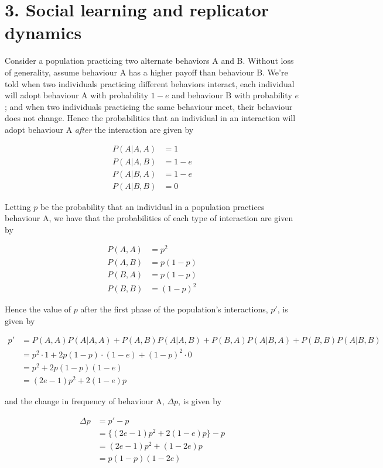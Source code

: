 \documentclass{article}
\begin{document}
\section*{3. Social learning and replicator dynamics}

Consider a population practicing two alternate behaviors A and B.
Without loss of generality, assume behaviour A has a higher payoff than
behaviour B. We're told when two individuals practicing different
behaviors interact, each individual will adopt behaviour A with
probability $1 - e$ and behaviour B with probability $e$; and when two
individuals practicing the same behaviour meet, their behaviour does not
change. Hence the probabilities that an individual in an interaction
will adopt behaviour A \textit{after} the interaction are given by

\begin{align*}
    P(A|A,A) &= 1 \\
    P(A|A,B) &= 1 - e \\
    P(A|B,A) &= 1 - e \\
    P(A|B,B) &= 0
\end{align*}

Letting $p$ be the probability that an individual in a population
practices behaviour A, we have that the probabilities of each type of
interaction are given by

\begin{align*}
    P(A,A) &= p^2 \\
    P(A,B) &= p(1 - p) \\
    P(B,A) &= p(1 - p) \\
    P(B,B) &= (1 - p)^2
\end{align*}

Hence the value of $p$ after the first phase of the population's
interactions, $p'$, is given by

\begin{align*}
    p' &= P(A,A)P(A|A,A) + P(A,B)P(A|A,B) + P(B,A)P(A|B,A) + P(B,B)P(A|B,B) \\
       &= p^2 \cdot 1 + 2p(1 - p) \cdot (1 - e) + (1 - p)^2 \cdot 0 \\
       &= p^2 + 2p(1 - p)(1 - e) \\
       &= (2e - 1)p^2 + 2(1 - e)p
\end{align*}

and the change in frequency of behaviour A, $\Delta p$, is given by

\begin{align*}
    \Delta p &= p' - p \\
             &= \{(2e - 1)p^2 + 2(1 - e)p\} - p \\
             &= (2e - 1)p^2 + (1 - 2e)p \\
             &= p(1 - p)(1 - 2e)
\end{align*}
\end{document}
